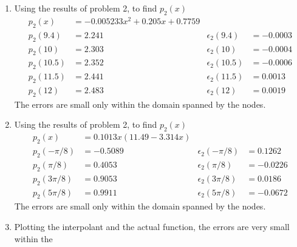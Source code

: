 \begin{enumerate}
    \item Using the results of problem 2, to find $ p_2(x) $
          \begin{align}
              p_2(x)    & = - 0.005233 x^{2}
              + 0.205 x + 0.7759                                            \\
              p_2(9.4)  & = 2.241            & \epsilon_2(9.4)  & = -0.0003 \\
              p_2(10)   & = 2.303            & \epsilon_2(10)   & = -0.0004 \\
              p_2(10.5) & = 2.352            & \epsilon_2(10.5) & = -0.0006 \\
              p_2(11.5) & = 2.441            & \epsilon_2(11.5) & = 0.0013  \\
              p_2(12)   & = 2.483            & \epsilon_2(12)   & = 0.0019
          \end{align}
          The errors are small only within the domain spanned by the nodes.

    \item Using the results of problem 2, to find $ p_2(x) $
          \begin{align}
              p_2(x)      & = 0.1013 x \left(11.49
              - 3.314 x\right)                                                      \\
              p_2(-\pi/8) & = -0.5089              & \epsilon_2(-\pi/8) & = 0.1262  \\
              p_2(\pi/8)  & = 0.4053               & \epsilon_2(\pi/8)  & = -0.0226 \\
              p_2(3\pi/8) & = 0.9053               & \epsilon_2(3\pi/8) & = 0.0186  \\
              p_2(5\pi/8) & = 0.9911               & \epsilon_2(5\pi/8) & = -0.0672
          \end{align}
          The errors are small only within the domain spanned by the nodes.

    \item Plotting the interpolant and the actual function, the errors are very small
          within the
          \begin{figure}[H]
              \centering
          \end{figure}


\end{enumerate}
